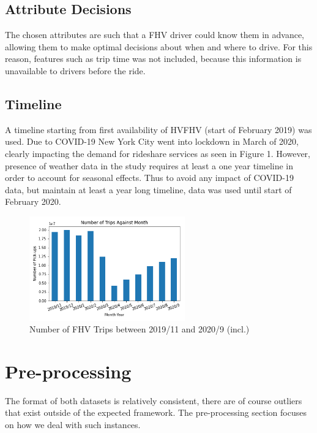 \documentclass[11pt]{article}
\begin{document}
\subsection{Attribute Decisions}

The chosen attributes are such that a FHV driver could know them in advance, allowing them to make optimal decisions about when and where to drive. For this reason, features such as trip time was not included, because this information is unavailable to drivers before the ride.

\subsection{Timeline}

A timeline starting from first availability of HVFHV (start of February 2019) was used. Due to COVID-19 New York City went into lockdown in March of 2020, clearly impacting the demand for rideshare services as seen in Figure 1. However, presence of weather data in the study requires at least a one year timeline in order to account for seasonal effects. Thus to avoid any impact of COVID-19 data, but maintain at least a year long timeline, data was used until start of February 2020.

\begin{figure}[h]
    \includegraphics[width=0.6\textwidth]{plots/trips_v_month.png}
    \centering
    \caption{Number of FHV Trips between 2019/11 and 2020/9 (incl.)}
\end{figure}

\section{Pre-processing}

The format of both datasets is relatively consistent, there are of course outliers that exist outside of the expected framework. The pre-processing section focuses on how we deal with such instances.
\end{document}
